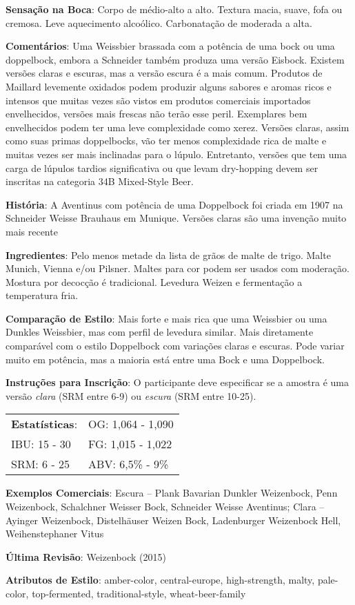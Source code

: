 \textbf{Sensação na Boca}: Corpo de médio-alto a alto. Textura macia, suave, fofa ou cremosa. Leve aquecimento alcoólico. Carbonatação de moderada a alta.

\textbf{Comentários}: Uma Weissbier brassada com a potência de uma bock ou uma doppelbock, embora a Schneider também produza uma versão Eisbock. Existem versões claras e escuras, mas a versão escura é a mais comum. Produtos de Maillard levemente oxidados podem produzir alguns sabores e aromas ricos e intensos que muitas vezes são vistos em produtos comerciais importados envelhecidos, versões mais frescas não terão esse peril. Exemplares bem envelhecidos podem ter uma leve complexidade como xerez. Versões claras, assim como suas primas doppelbocks, vão ter menos complexidade rica de malte e muitas vezes ser mais inclinadas para o lúpulo. Entretanto, versões que tem uma carga de lúpulos tardios significativa ou que levam dry-hopping devem ser inscritas na categoria 34B Mixed-Style Beer.

\textbf{História}: A Aventinus com potência de uma Doppelbock foi criada em 1907 na Schneider Weisse Brauhaus em Munique. Versões claras são uma invenção muito mais recente

\textbf{Ingredientes}: Pelo menos metade da lista de grãos de malte de trigo. Malte Munich, Vienna e/ou Pilsner. Maltes para cor podem ser usados com moderação. Mostura por decocção é tradicional. Levedura Weizen e fermentação a temperatura fria.

\textbf{Comparação de Estilo}: Mais forte e mais rica que uma Weissbier ou uma Dunkles Weissbier, mas com perfil de levedura similar. Mais diretamente comparável com o estilo Doppelbock com variações claras e escuras. Pode variar muito em potência, mas a maioria está entre uma Bock e uma Doppelbock.

\textbf{Instruções para Inscrição}: O participante deve especificar se a amostra é uma versão \textit{clara} (SRM entre 6-9) ou \textit{escura} (SRM entre 10-25).

\begin{tabular}{@{}p{35mm}p{35mm}@{}}
  \textbf{Estatísticas}: & OG: 1,064 - 1,090 \\
  IBU: 15 - 30 & FG: 1,015 - 1,022 \\
  SRM: 6 - 25 & ABV: 6,5\% - 9\%
\end{tabular}

\textbf{Exemplos Comerciais}: Escura – Plank Bavarian Dunkler Weizenbock, Penn Weizenbock, Schalchner Weisser Bock, Schneider Weisse Aventinus; Clara – Ayinger Weizenbock, Distelhäuser Weizen Bock, Ladenburger Weizenbock Hell, Weihenstephaner Vitus

\textbf{Última Revisão}: Weizenbock (2015)

\textbf{Atributos de Estilo}: amber-color, central-europe, high-strength, malty, pale-color, top-fermented, traditional-style, wheat-beer-family